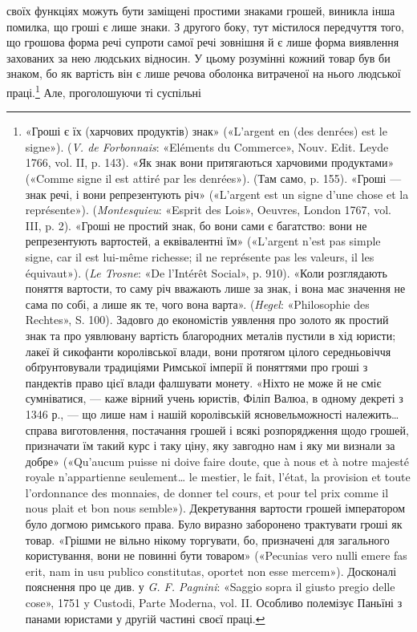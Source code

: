 своїх функціях можуть бути заміщені простими знаками грошей,
виникла інша помилка, що гроші є лише знаки. З другого боку,
тут містилося передчуття того, що грошова форма речі супроти
самої речі зовнішня й є лише форма виявлення захованих за нею
людських відносин. У цьому розумінні кожний товар був би
знаком, бо як вартість він є лише речова оболонка витраченої
на нього людської праці.\footnote{
«Гроші є їх (харчових продуктів) знак» («L’argent en (des denrées)
est le signe»). (\emph{V. de Forbonnais}: «Eléments du Commerce»,
Nouv. Edit. Leyde 1766, vol. II, p. 143). «Як знак вони притягаються
харчовими продуктами» («Comme signe il est attiré par les denrées»). (Там
само, p. 155). «Гроші — знак речі, і вони репрезентують річ» («L’argent
est un signe d’une chose et la représente»). (\emph{Montesquieu}: «Esprit des
Lois», Oeuvres, London 1767, vol. III, p. 2). «Гроші не простий знак,
бо вони сами є багатство: вони не репрезентують вартостей, а еквівалентні
їм» («L’argent n’est pas simple signe, car il est lui-même richesse; il
ne représente pas les valeurs, il les équivaut»). (\emph{Le Trosne}: «De l’Intérêt
Social», p. 910). «Коли розглядають поняття вартости, то саму річ
вважають лише за знак, і вона має значення не сама по собі, а лише як
те, чого вона варта». (\emph{Hegel}: «Philosophie des Rechtes», S. 100). Задовго
до економістів уявлення про золото як простий знак та про уявлювану
вартість благородних металів пустили в хід юристи; лакеї й сикофанти
королівської влади, вони протягом цілого середньовіччя обґрунтовували
традиціями Римської імперії й поняттями про гроші з пандектів
право цієї влади фалшувати монету. «Ніхто не може й не сміє сумніватися,
— каже вірний учень юристів, Філіп Валюа, в одному декреті з 1346 р., —
що лише нам і нашій королівській ясновельможності належить\dots{} справа
виготовлення, постачання грошей і всякі розпорядження щодо грошей,
призначати їм такий курс і таку ціну, яку завгодно нам і яку ми визнали
за добре» («Qu’aucum puisse ni doive faire doute, que à nous et à notre
majesté royale n’appartienne seulement\dots{} le mestier, le fait, l’état, la provision
et toute l’ordonnance des monnaies, de donner tel cours, et pour tel
prix comme il nous plait et bon nous semble»). Декретування вартости
грошей імператором було догмою римського права. Було виразно заборонено
трактувати гроші як товар. «Грішми не вільно нікому торгувати,
бо, призначені для загального користування, вони не повинні бути товаром»
(«Pecunias vero nullі emere fas erit, nam in usu publico constitutas,
oportet non esse mercem»). Досконалі пояснення про це див. у \emph{G. F. Pagnini}:
«Saggio sopra il giusto pregio delle cose», 1751 y Custodi, Parte
Moderna, vol. II. Особливо полемізує Паньїні з панами юристами у другій
частині своєї праці.
} Але, проголошуючи ті суспільні
